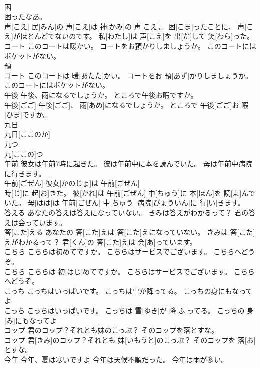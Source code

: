 \documentclass[8pt]{extreport}
\begin{document}
\begin{CJK}{UTF8}{min}
\\	困
\\	困ったなあ。
\\	声[こえ] 民[みん]の 声[こえ]は 神[かみ]の 声[こえ]。 困[こま]ったことに、 声[こえ]がほとんどでないのです。 私[わたし]は 声[こえ]を 出[だ]して 笑[わら]った。
\\	コート このコートは暖かい。 コートをお預かりしましょうか。 このコートにはポケットがない。	
\\	預 
\\	コート このコートは 暖[あたた]かい。 コートをお 預[あず]かりしましょうか。 このコートにはポケットがない。
\\	午後 午後、雨になるでしょうか。 ところで午後お暇ですか。	
\\	午後[ごご] 午後[ごご]、 雨[あめ]になるでしょうか。 ところで 午後[ごご]お 暇[ひま]ですか。
\\	九日	
\\	九日[ここのか]
\\	九つ	
\\	九[ここの]つ
\\	午前 彼女は午前7時に起きた。 彼は午前中に本を読んでいた。 母は午前中病院に行きます。	
\\	午前[ごぜん] 彼女[かのじょ]は 午前[ごぜん] 
\\	時[じ]に 起[お]きた。 彼[かれ]は 午前[ごぜん] 中[ちゅう]に 本[ほん]を 読[よ]んでいた。 母[はは]は 午前[ごぜん] 中[ちゅう] 病院[びょういん]に 行[い]きます。
\\	答える あなたの答えは答えになっていない。 きみは答えがわかるって？ 君の答えは会っています。	
\\	答[こた]える あなたの 答[こた]えは 答[こた]えになっていない。 きみは 答[こた]えがわかるって？ 君[くん]の 答[こた]えは 会[あ]っています。
\\	こちら こちらは初めてですか。 こちらはサービスでございます。 こちらへどうぞ。	
\\	こちら こちらは 初[はじ]めてですか。 こちらはサービスでございます。 こちらへどうぞ。
\\	こっち こっちはいっぱいです。 こっちは雪が降ってる。 こっちの身にもなってよ	
\\	こっち こっちはいっぱいです。 こっちは 雪[ゆき]が 降[ふ]ってる。 こっちの 身[み]にもなってよ
\\	コップ 君のコップ？それとも妹のこっぷ？ そのコップを落とすな。	
\\	コップ 君[きみ]のコップ？それとも 妹[いもうと]のこっぷ？ そのコップを 落[お]とすな。
\\	今年 今年、夏は寒いですよ 今年は天候不順だった。 今年は雨が多い。	

\end{CJK}
\end{document}
